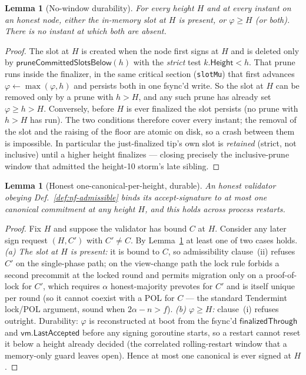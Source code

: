 \documentclass[11pt]{article}
\newtheorem{lemma}[theorem]{Lemma}
\begin{document}
\begin{lemma}[No-window durability]
\label{lem:nf-nowindow}
For every height $H$ and at every instant on an honest node, either the
in-memory slot at $H$ is present, or $\varphi \ge H$ (or both). There is
no instant at which both are absent.
\end{lemma}
\begin{proof}
The slot at $H$ is created when the node first signs at $H$ and is
deleted only by $\mathsf{pruneCommittedSlotsBelow}(h)$ with the
\emph{strict} test $k.\mathsf{Height} < h$. That prune runs inside the
finalizer, in the same critical section (\texttt{slotMu}) that first
advances $\varphi \gets \max(\varphi, h)$ and persists both in one
fsync'd write. So the slot at $H$ can be removed only by a prune with
$h > H$, and any such prune has already set $\varphi \ge h > H$.
Conversely, before $H$ is ever finalized the slot persists (no prune
with $h>H$ has run). The two conditions therefore cover every instant;
the removal of the slot and the raising of the floor are atomic on disk,
so a crash between them is impossible. In particular the just-finalized
tip's own slot is \emph{retained} (strict, not inclusive) until a higher
height finalizes --- closing precisely the inclusive-prune window that
admitted the height-10 storm's late sibling.
\end{proof}

\begin{lemma}[Honest one-canonical-per-height, durable]
\label{lem:nf-oneper}
An honest validator obeying Def.~\ref{def:nf-admissible} binds its
accept-signature to at most one canonical commitment at any height $H$,
and this holds across process restarts.
\end{lemma}
\begin{proof}
Fix $H$ and suppose the validator has bound $C$ at $H$. Consider any
later sign request $(H, C')$ with $C' \ne C$. By
Lemma~\ref{lem:nf-nowindow} at least one of two cases holds. \emph{(a)
The slot at $H$ is present:} it is bound to $C$, so admissibility
clause~(ii) refuses $C'$ on the single-phase path; on the view-change
path the lock rule forbids a second precommit at the locked round and
permits migration only on a proof-of-lock for $C'$, which requires
$\alpha$ honest-majority prevotes for $C'$ and is itself unique per
round (so it cannot coexist with a POL for $C$ --- the standard
Tendermint lock/POL argument, sound when $2\alpha - n > f$). \emph{(b)
$\varphi \ge H$:} clause~(i) refuses outright. Durability: $\varphi$ is
reconstructed at boot from the fsync'd $\mathsf{finalizedThrough}$ and
$\mathsf{vm.LastAccepted}$ before any signing goroutine starts, so a
restart cannot reset it below a height already decided (the correlated
rolling-restart window that a memory-only guard leaves open). Hence at
most one canonical is ever signed at $H$.
\end{proof}
\end{document}

